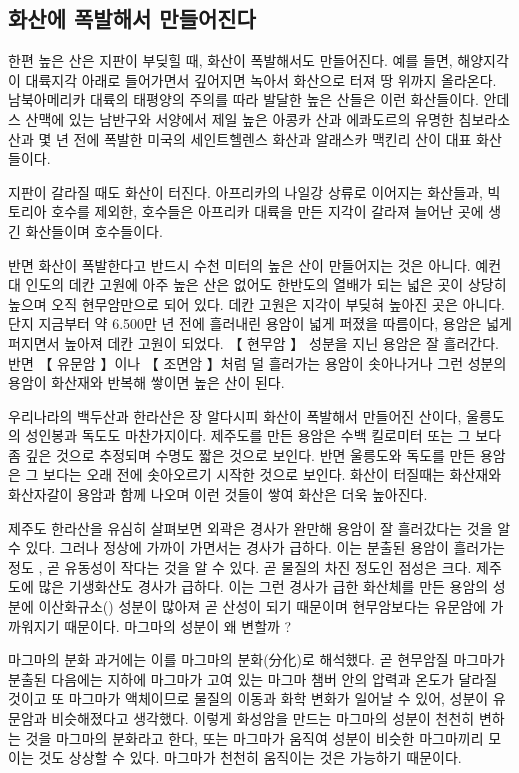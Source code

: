 \documentclass[12pt, a4paper, oneside]{book}
\begin{document}
\subsection{화산에 폭발해서 만들어진다}


한편 높은 산은 지판이 부딪힐 때, 화산이 폭발해서도 만들어진다. 예를 들면, 해양지각이 대륙지각 아래로 들어가면서 깊어지면 녹아서 화산으로 터져 땅 위까지 올라온다. 남북아메리카 대륙의 태평양의 주의를 따라 발달한 높은 산들은 이런 화산들이다. 안데스 산맥에 있는 남반구와 서양에서 제일 높은 아콩카 산과 에콰도르의 유명한 침보라소 산과 몇 년 전에 폭발한 미국의 세인트헬렌스 화산과 알래스카 맥킨리 산이 대표 화산들이다. 

지판이 갈라질 때도 화산이 터진다. 아프리카의 나일강 상류로 이어지는 화산들과, 빅토리아 호수를 제외한, 호수들은 아프리카 대륙을 만든 지각이 갈라져 늘어난 곳에 생긴 화산들이며 호수들이다.

반면 화산이 폭발한다고 반드시 수천 미터의 높은 산이 만들어지는 것은 아니다. 예컨대 인도의 데칸 고원에 아주 높은 산은 없어도 한반도의 열배가 되는 넓은 곳이 상당히 높으며 오직 현무암만으로 되어 있다. 데칸 고원은 지각이 부딪혀 높아진 곳은 아니다. 단지 지금부터 약 6.500만 년 전에 흘러내린 용암이 넓게 퍼졌을 따름이다, 용암은 넓게 퍼지면서 높아져 데칸 고원이 되었다. 【 현무암 】 성분을 지닌 용암은 잘 흘러간다. 반면 【 유문암 】이나 【 조면암 】처럼 덜 흘러가는 용암이 솟아나거나 그런 성분의 용암이 화산재와 반복해 쌓이면 높은 산이 된다.

우리나라의 백두산과 한라산은 장 알다시피 화산이 폭발해서 만들어진 산이다, 울릉도의 성인봉과 독도도 마찬가지이다. 제주도를 만든 용암은 수백 킬로미터 또는 그 보다 좀 깊은 것으로 추정되며 수명도 짧은 것으로 보인다. 반면 울릉도와 독도를 만든 용암은 그 보다는 오래 전에 솟아오르기 시작한 것으로 보인다. 화산이 터질때는 화산재와 화산자갈이 용암과 함께 나오며 이런 것들이 쌓여 화산은 더욱 높아진다.

제주도 한라산을 유심히 살펴보면 외곽은 경사가 완만해 용암이 잘 흘러갔다는 것을 알 수 있다. 그러나 정상에 가까이 가면서는 경사가 급하다. 이는 분출된 용암이 흘러가는 정도 , 곧 유동성이 작다는 것을 알 수 있다. 곧 물질의 차진 정도인 점성은 크다. 제주도에 많은 기생화산도 경사가 급하다. 이는 그런 경사가 급한 화산체를 만든 용암의 성분에 이산화규소() 성분이 많아져 곧 산성이 되기 때문이며 현무암보다는 유문암에 가까워지기 때문이다. 마그마의 성분이 왜 변할까 ?

마그마의 분화
과거에는 이를 마그마의 분화(分化)로 해석했다. 곧 현무암질 마그마가 분출된 다음에는 지하에 마그마가 고여 있는 마그마 챔버 안의 압력과 온도가 달라질 것이고 또 마그마가 액체이므로 물질의 이동과 화학 변화가 일어날 수 있어, 성분이 유문암과 비슷해졌다고 생각했다. 이렇게 화성암을 만드는 마그마의 성분이 천천히 변하는 것을 마그마의 분화라고 한다, 또는 마그마가 움직여 성분이 비슷한 마그마끼리 모이는 것도 상상할 수 있다. 마그마가 천천히 움직이는 것은 가능하기 때문이다. 
\end{document}
